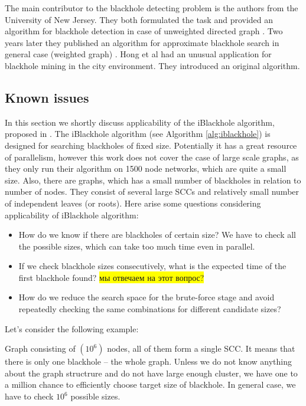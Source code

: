 \documentclass{svproc}
\newcommand{\FIXME}[1]{ %
	\colorbox{yellow}{#1}
}
\newcommand{\FIXME}[1]{ %
}
\begin{document}
The main contributor to the blackhole detecting problem is the authors from the University of New Jersey. They both formulated the task and provided an algorithm for blackhole detection in case of unweighted directed graph \cite{li2010detecting}. 
Two years later they published an algorithm for approximate blackhole search in general case (weighted graph) \cite{li2012mining,li2014mining}. 
Hong et al \cite{hong2015detecting} had
an unusual application for blackhole mining in the city environment. They introduced an original algorithm.  

\subsection{Known issues}
In this section we shortly discuss applicability of the iBlackhole algorithm, proposed in \cite{li2010detecting}.
The iBlackhole algorithm (see Algorithm \ref{alg:iblackhole}) is designed for searching blackholes of fixed size. Potentially it has a great resource of parallelism, however this work does not cover the case of large scale graphs, as they only run their algorithm on 1500 node networks, which are quite
a small size.
Also, there are graphs, which has a small number of blackholes in relation to number of nodes. They consist
of several large SCCs and relatively small number of independent leaves (or roots). Here arise some questions considering applicability of
iBlackhole algorithm:
\begin{itemize}
\item How do we know if there are blackholes of certain size? We have to check all the possible sizes, which can take too much time even in parallel.
\item If we check blackhole sizes consecutively, what is the expected time of the first blackhole found? \FIXME{мы отвечаем на этот вопрос?}
\item How do we reduce the search space for the brute-force stage and avoid repeatedly checking the same combinations for different candidate sizes?
\end{itemize}

Let's consider the following example:

Graph consisting of $(10^6)$ nodes, all of them form a single SCC. It means that there is only one blackhole -- the whole graph.
Unless we do not know anything about the graph structrure and do not have large enough cluster, we have one to a million chance
to efficiently choose target size of blackhole. In general case, we have to check $10^6$ possible sizes.
\end{document}
